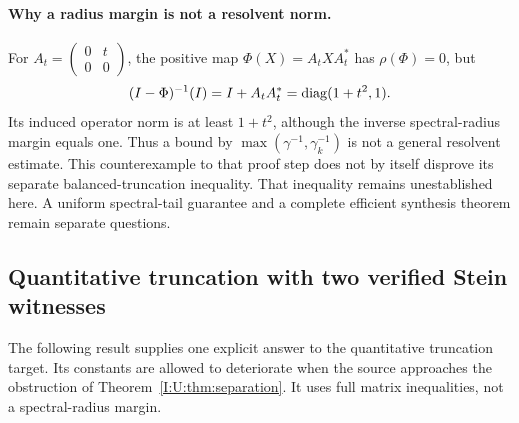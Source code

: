 \paragraph{Why a radius margin is not a resolvent norm.}
For $A_t=\left(\begin{smallmatrix}0&t\\0&0\end{smallmatrix}\right)$,
the positive map $\Phi(X)=A_tXA_t^*$ has $\rho(\Phi)=0$, but
\[
 (I-\Phi)^{-1}(I)=I+A_tA_t^*
       =\operatorname{diag}(1+t^2,1).
\]
Its induced operator norm is at least $1+t^2$, although the inverse
spectral-radius margin equals one. Thus a bound by
$\max(\gamma^{-1},\gamma_k^{-1})$ is not a general resolvent estimate.
This counterexample to that proof step does not by itself disprove its
separate balanced-truncation inequality. That inequality remains
unestablished here. A uniform spectral-tail guarantee and a complete efficient synthesis theorem remain separate questions.


\subsection{Quantitative truncation with two verified Stein witnesses}
\label{I:U:sec:quantitative-truncation}
The following result supplies one explicit answer to the quantitative
truncation target. Its constants are allowed to deteriorate when the
source approaches the obstruction of Theorem~\ref{I:U:thm:separation}.
It uses full matrix inequalities, not a spectral-radius margin.

